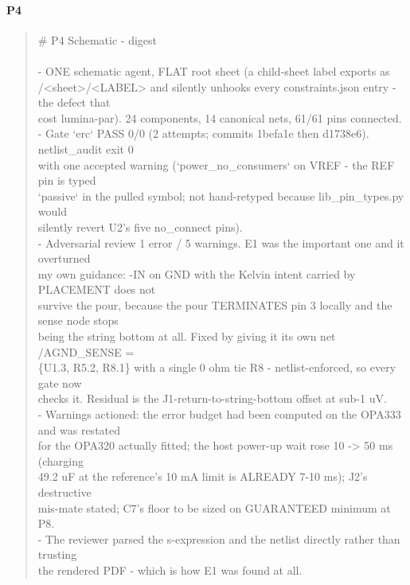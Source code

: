 \documentclass[11pt,a4paper]{article}
\begin{document}
\paragraph*{P4}
\begin{quote}\small\ttfamily\raggedright
\# P4 Schematic - digest\\
~\\
- ONE schematic agent, FLAT root sheet (a child-sheet label exports as\\
  /\textless{}sheet\textgreater{}/\textless{}LABEL\textgreater{} and silently unhooks every constraints.json entry - the defect that\\
  cost lumina-par). 24 components, 14 canonical nets, 61/61 pins connected.\\
- Gate `erc` PASS 0/0 (2 attempts; commits 1befa1e then d1738e6). netlist\_audit exit 0\\
  with one accepted warning (`power\_no\_consumers` on VREF - the REF pin is typed\\
  `passive` in the pulled symbol; not hand-retyped because lib\_pin\_types.py would\\
  silently revert U2's five no\_connect pins).\\
- Adversarial review 1 error / 5 warnings. E1 was the important one and it overturned\\
  my own guidance: -IN on GND with the Kelvin intent carried by PLACEMENT does not\\
  survive the pour, because the pour TERMINATES pin 3 locally and the sense node stops\\
  being the string bottom at all. Fixed by giving it its own net /AGND\_SENSE =\\
  \{U1.3, R5.2, R8.1\} with a single 0 ohm tie R8 - netlist-enforced, so every gate now\\
  checks it. Residual is the J1-return-to-string-bottom offset at sub-1 uV.\\
- Warnings actioned: the error budget had been computed on the OPA333 and was restated\\
  for the OPA320 actually fitted; the host power-up wait rose 10 -\textgreater{} 50 ms (charging\\
  49.2 uF at the reference's 10 mA limit is ALREADY 7-10 ms); J2's destructive\\
  mis-mate stated; C7's floor to be sized on GUARANTEED minimum at P8.\\
- The reviewer parsed the s-expression and the netlist directly rather than trusting\\
  the rendered PDF - which is how E1 was found at all.
\end{quote}
\end{document}
